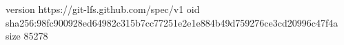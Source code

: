 version https://git-lfs.github.com/spec/v1
oid sha256:98fc900928ed64982c315b7cc77251e2e1e884b49d759276ce3cd20996c47f4a
size 85278
